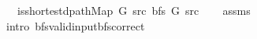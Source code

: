 \begin{isabellebody}
\ \ \ {\isachardoublequoteopen}is{\isacharunderscore}{\kern0pt}shortest{\isacharunderscore}{\kern0pt}dpath{\isacharunderscore}{\kern0pt}Map\ G\ src\ {\isacharparenleft}{\kern0pt}bfs\ G\ src{\isacharparenright}{\kern0pt}{\isachardoublequoteclose}\isanewline
%
\isadelimproof
\ \ %
\endisadelimproof
%
\isatagproof
{}\isamarkupfalse%
\ assms\isanewline
\ \ \isamarkupfalse%
\ {\isacharparenleft}{\kern0pt}intro\ bfs{\isacharunderscore}{\kern0pt}valid{\isacharunderscore}{\kern0pt}input{\isachardot}{\kern0pt}bfs{\isacharunderscore}{\kern0pt}correct{\isacharparenright}{\kern0pt}%
\endisatagproof
{\isafoldproof}%
%
\isadelimproof
\isanewline
%
\endisadelimproof
%
\isadelimtheory
\isanewline
%
\endisadelimtheory
%
\isatagtheory
{}\isamarkupfalse%
%
\endisatagtheory
{\isafoldtheory}%
%
\isadelimtheory
%
\endisadelimtheory
%
\end{isabellebody}%
\endinput
